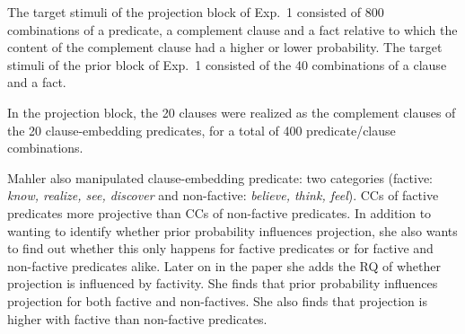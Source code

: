\documentclass[11pt,fleqn]{article}
\newcommand{\6}{\mbox{$[\hspace*{-.6mm}[$}}
\newcommand{\9}{\mbox{$]\hspace*{-.6mm}]$}}
\begin{document}
The target stimuli of the projection block of Exp.~1 consisted of 800 combinations of a predicate, a complement clause and a fact relative to which the content of the complement clause had a higher or lower probability. The target stimuli of the prior block of Exp.~1 consisted of the 40 combinations of a clause and a fact.

In the projection block, the 20 clauses were realized as the complement clauses of the 20 clause-embedding predicates, for a total of 400 predicate/clause combinations. 


Mahler also manipulated clause-embedding predicate: two categories (factive: {\em know, realize, see, discover} and non-factive: {\em believe, think, feel}). CCs of factive predicates more projective than CCs of non-factive predicates. In addition to wanting to identify whether prior probability influences projection, she also wants to find out whether this only happens for factive predicates or for factive and non-factive predicates alike. Later on in the paper she adds the RQ of whether projection is influenced by factivity. She finds that prior probability influences projection for both factive and non-factives.  She also finds that projection is higher with factive than non-factive predicates. 
\end{document}

